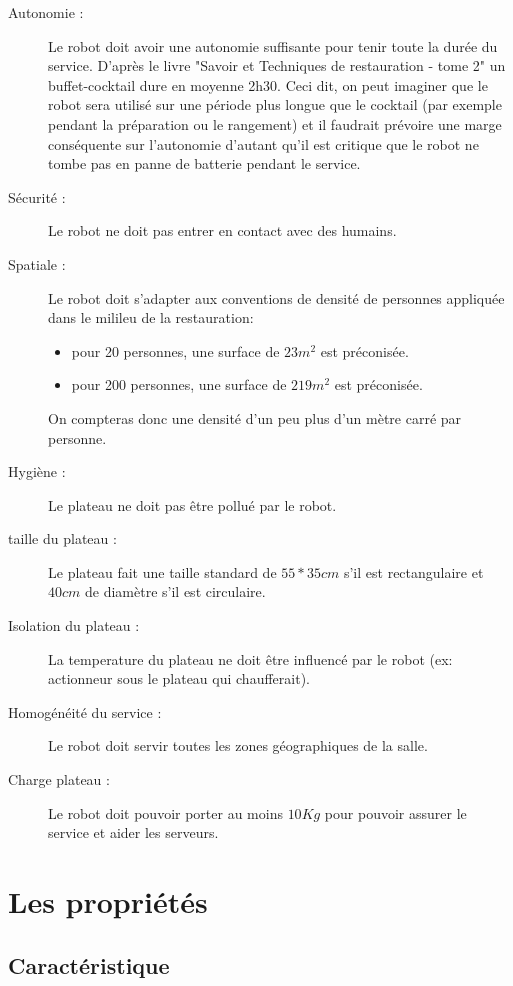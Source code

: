 \begin{description}
\item[Autonomie :] Le robot doit avoir une autonomie suffisante pour
  tenir toute la durée du service. D'après le livre "Savoir et
  Techniques de restauration - tome 2" un buffet-cocktail dure en
  moyenne 2h30. Ceci dit, on peut imaginer que le robot sera utilisé
  sur une période plus longue que le cocktail (par exemple pendant la
  préparation ou le rangement) et il faudrait prévoire une marge
  conséquente sur l'autonomie d'autant qu'il est critique que le robot
  ne tombe pas en panne de batterie pendant le service.
\item[Sécurité :] Le robot ne doit pas entrer en contact avec des humains.
\item[Spatiale :] Le robot doit s'adapter aux conventions de densité
  de personnes appliquée dans le milileu de la restauration:
  \begin{itemize}
  \item pour 20 personnes, une surface de $23m^2$ est préconisée.
  \item pour 200 personnes, une surface de $219m^2$ est préconisée.
  \end{itemize}
  On compteras donc une densité d'un peu plus d'un mètre carré par
  personne.
\item[Hygiène :] Le plateau ne doit pas être pollué par le robot.
\item[taille du plateau :] Le plateau fait une taille standard de
  $55*35cm$ s'il est rectangulaire et $40cm$ de diamètre s'il est
  circulaire.
\item[Isolation du plateau :] La temperature du plateau ne doit être
  influencé par le robot (ex: actionneur sous le plateau qui
  chaufferait).
\item[Homogénéité du service :] Le robot doit servir toutes les zones
  géographiques de la salle.
\item[Charge plateau :] Le robot doit pouvoir porter au moins $10Kg$
  pour pouvoir assurer le service et aider les serveurs.
\end{description}



\section{Les propriétés}
\subsection{Caractéristique}
